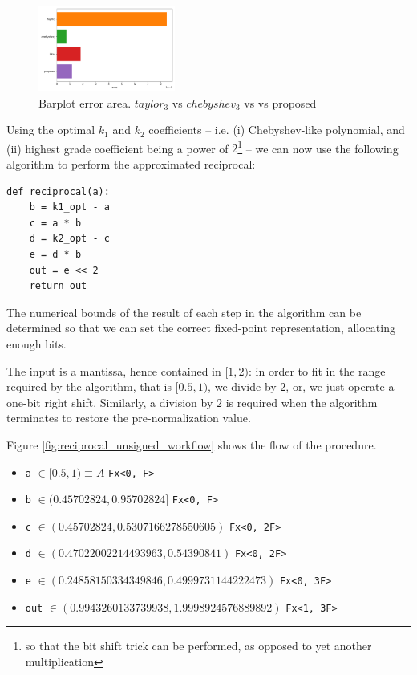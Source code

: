 \begin{figure}
    \begin{center}
    \includegraphics[width=0.4\textwidth]{figures/barplot_area_error.pdf}
    \caption{Barplot error area. $taylor_3$ vs $chebyshev_3$ vs \cite{drom} vs proposed}
    \label{fig:are_barplot}
    \end{center}
\end{figure}


Using the optimal $k_1$ and $k_2$ coefficients -- i.e. (i) Chebyshev-like polynomial, and (ii) highest grade coefficient being a power of $2$\footnote{so that the bit shift trick can be performed, as opposed to yet another multiplication} -- we can now use the following algorithm to perform the approximated reciprocal:

\begin{lstlisting}[label=alg:reciprocal_approx_modified_drom]
def reciprocal(a):
    b = k1_opt - a
    c = a * b
    d = k2_opt - c
    e = d * b
    out = e << 2
    return out
\end{lstlisting}

The numerical bounds of the result of each step in the algorithm can be determined so that we can set the correct fixed-point representation, allocating enough bits.

The input is a mantissa, hence contained in $[1, 2)$: in order to fit in the range required by the algorithm, that is $[0.5, 1)$, we divide by $2$, or, we just operate a one-bit right shift. Similarly, a division by $2$ is required when the algorithm terminates to restore the pre-normalization value.


Figure \ref{fig:reciprocal_unsigned_workflow} shows the flow of the procedure. 



\begin{itemize}
    \item \texttt{a} $\in [0.5, 1) \equiv A $ \dotfill \texttt{Fx<0, F>}
    \item \texttt{b} $\in (0.45702824, 0.95702824] $ \dotfill \texttt{Fx<0, F>}
    \item \texttt{c} $\in (0.45702824, 0.5307166278550605) $ \dotfill \texttt{Fx<0, 2F>}
    \item \texttt{d} $\in (0.47022002214493963, 0.54390841) $ \dotfill \texttt{Fx<0, 2F>}
    \item \texttt{e} $\in (0.24858150334349846, 0.4999731144222473) $ \dotfill \texttt{Fx<0, 3F>}
    \item \texttt{out} $\in (0.9943260133739938, 1.9998924576889892) $ \dotfill \texttt{Fx<1, 3F>}
\end{itemize}



